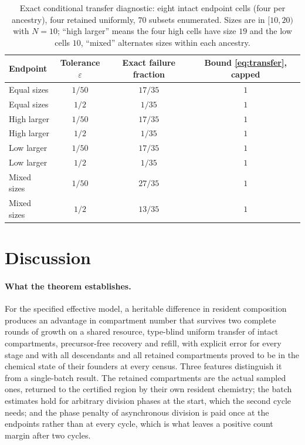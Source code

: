 \documentclass[11pt,a4paper]{article}
\theoremstyle{plain}
\theoremstyle{definition}
\theoremstyle{remark}
\newcommand{\eps}{\varepsilon}
\begin{document}
\begin{table}[tb]
\centering\small
\caption{Exact conditional transfer diagnostic: eight intact endpoint cells (four per ancestry), four retained uniformly, $70$ subsets enumerated. Sizes are in $[10,20)$ with $N=10$; ``high larger'' means the four high cells have size $19$ and the low cells $10$, ``mixed'' alternates sizes within each ancestry.}
\label{tab:transfer}
\begin{tabular}{lccc}
\toprule
Endpoint & Tolerance $\eps$ & Exact failure fraction & Bound \eqref{eq:transfer}, capped\\
\midrule
Equal sizes & $1/50$ & $17/35$ & $1$\\
Equal sizes & $1/2$ & $1/35$ & $1$\\
High larger & $1/50$ & $17/35$ & $1$\\
High larger & $1/2$ & $1/35$ & $1$\\
Low larger & $1/50$ & $17/35$ & $1$\\
Low larger & $1/2$ & $1/35$ & $1$\\
Mixed sizes & $1/50$ & $27/35$ & $1$\\
Mixed sizes & $1/2$ & $13/35$ & $1$\\
\bottomrule
\end{tabular}
\end{table}

\section{Discussion}\label{sec:discussion}

\paragraph{What the theorem establishes.}
For the specified effective model, a heritable difference in resident composition produces an advantage in compartment number that survives two complete rounds of growth on a shared resource, type-blind uniform transfer of intact compartments, precursor-free recovery and refill, with explicit error for every stage and with all descendants and all retained compartments proved to be in the chemical state of their founders at every census. Three features distinguish it from a single-batch result. The retained compartments are the actual sampled ones, returned to the certified region by their own resident chemistry; the batch estimates hold for arbitrary division phases at the start, which the second cycle needs; and the phase penalty of asynchronous division is paid once at the endpoints rather than at every cycle, which is what leaves a positive count margin after two cycles.
\end{document}

